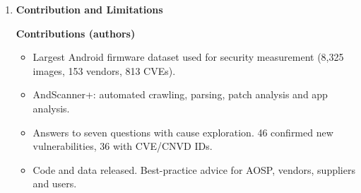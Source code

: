 \documentclass[11pt,a4paper]{article}
\newcommand{\entrypart}[1]{\textbf{\color{accent}#1}\par\vspace{2pt}}
\begin{document}
\begin{enumerate}
\begin{itemize}
        \item \textbf{Q5 Potential risks}
        \begin{itemize}
            \item 5,152 images (61.9\%) from all 153 vendors contain potentially vulnerable apps.
            \item Realme most (518 apps per image on average, 84.19\% of risky apps from third parties). Huawei least.
            \item 319 exploitable vulnerabilities submitted. 46 confirmed from 15 vendors, 36 CVE/CNVD IDs.
            \item Cases: vivo weather provider leaks location (CVE-2021-26279, 109 images). Samsung app with hard-coded AES key. Google telephony provider leaks SIM data, fixed only in Android 13.
            \item Same bug reported to 9 vendors: 4 confirmed, 4 ignored.
        \end{itemize}
        \item \textbf{Q6 Source:} vendors 163,618 (73.9\%), third parties 36,261 (16.4\%), AOSP 21,516 (9.7\%) of potentially vulnerable apps.
        \item \textbf{Q7 Region:}
        \begin{itemize}
            \item Samsung: Latin America longest average delay (20.63 months), Northern America shortest (0.08).
            \item Huawei: no missing patches in any region.
            \item Xiaomi: unfixed app CVEs in three regions.
            \item Samsung SM-G920 (Oct 2020): Brazil 15 months vs Chile 35 months.
        \end{itemize}
    \end{itemize}

    \item \entrypart{Contribution and Limitations}

    \textbf{Contributions (authors)}
    \begin{itemize}
        \item Largest Android firmware dataset used for security measurement (8,325 images, 153 vendors, 813 CVEs).
        \item AndScanner+: automated crawling, parsing, patch analysis and app analysis.
        \item Answers to seven questions with cause exploration. 46 confirmed new vulnerabilities, 36 with CVE/CNVD IDs.
        \item Code and data released. Best-practice advice for AOSP, vendors, suppliers and users.
    \end{itemize}


\end{enumerate}
\end{document}
